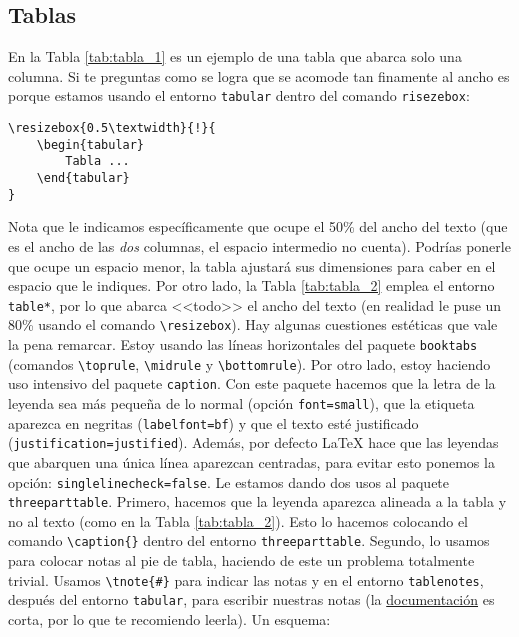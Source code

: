 \documentclass[a4paper,10pt,twocolumn,twoside]{article}
\begin{document}
\subsection{Tablas}

En la Tabla \ref{tab:tabla_1} es un ejemplo de una tabla que abarca solo una columna. Si te preguntas como se logra que se acomode tan finamente al ancho es porque estamos usando el entorno \texttt{tabular} dentro del comando \texttt{risezebox}:
\begin{Verbatim}[fontsize=\fontsize{7pt}{7pt}\selectfont]
\resizebox{0.5\textwidth}{!}{
    \begin{tabular}
        Tabla ...
    \end{tabular}
}
\end{Verbatim}
Nota que le indicamos específicamente que ocupe el 50\% del ancho del texto (que es el ancho de las \emph{dos} columnas, el espacio intermedio no cuenta). Podrías ponerle que ocupe un espacio menor, la tabla ajustará sus dimensiones para caber en el espacio que le indiques. Por otro lado, la Tabla \ref{tab:tabla_2} emplea el entorno \texttt{table*}, por lo que abarca <<todo>> el ancho del texto (en realidad le puse un 80\% usando el comando \verb+\resizebox+). Hay algunas cuestiones estéticas que vale la pena remarcar. Estoy usando las líneas horizontales del paquete \texttt{booktabs} (comandos \verb+\toprule+, \verb+\midrule+ y \verb+\bottomrule+). Por otro lado, estoy haciendo uso intensivo del paquete \texttt{caption}. Con este paquete hacemos que la letra de la leyenda sea más pequeña de lo normal (opción \texttt{font=small}), que la etiqueta aparezca en negritas (\texttt{labelfont=bf}) y que el texto esté justificado (\texttt{justification=justified}). Además, por defecto \LaTeX{} hace que las leyendas que abarquen una única línea aparezcan centradas, para evitar esto ponemos la opción: \texttt{singlelinecheck=false}. Le estamos dando dos usos al paquete \texttt{threeparttable}. Primero, hacemos que la leyenda aparezca alineada a la tabla y no al texto (como en la Tabla \ref{tab:tabla_2}). Esto lo hacemos colocando el comando \verb+\caption{}+ dentro del entorno \texttt{threeparttable}. Segundo, lo usamos para colocar notas al pie de tabla, haciendo de este un problema totalmente trivial. Usamos \verb+\tnote{#}+ para indicar las notas y en el entorno \texttt{tablenotes}, después del entorno \texttt{tabular}, para escribir nuestras notas (la \href{https://ctan.dcc.uchile.cl/macros/latex/contrib/threeparttable/threeparttable.pdf}{documentación} es corta, por lo que te recomiendo leerla). Un esquema:
\end{document}
